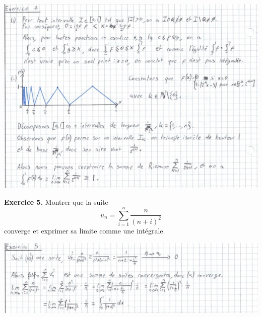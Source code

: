 \documentclass[a4paper, 10pt]{report}
\begin{document}
	\includegraphics{ex04.jpg}
		
	\noindent
	\textbf{Exercice 5.} Montrer que la suite
	\[u_n = \sum_{i=1}^{n}\frac{n}{(n+i)^2}\]
	converge et exprimer sa limite comme une intégrale.
	
	\includegraphics{ex05.jpg}
		
	\newpage
	
\end{document}
